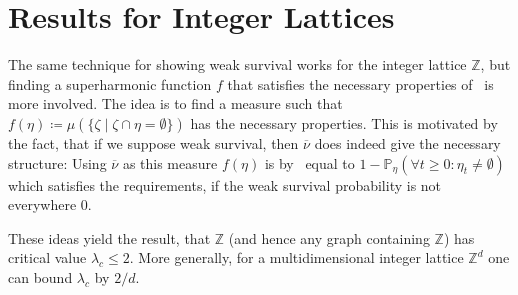 \documentclass[a4paper,11pt]{amsart}
\theoremstyle{theorem}
\theoremstyle{definition}
\newcommand{\Z}{\mathbb{Z}}
\renewcommand{\P}{\mathbb{P}}
\begin{document}
\section{Results for Integer Lattices}

The same technique for showing weak survival works for the integer lattice $\Z$, but finding a superharmonic function $f$ that satisfies the necessary properties of~ is more involved.
The idea is to find a measure such that $f(\eta)\coloneqq \mu(\{  \zeta \mid \zeta\cap\eta = \emptyset \})$ has the necessary properties.
This is motivated by the fact, that if we suppose weak survival, then $\overline{\nu}$ does indeed give the necessary structure:
Using $\overline{\nu}$ as this measure $f(\eta)$ is by~ equal to $1-\P_\eta(\forall t\geq0: \eta_t\neq \emptyset)$ which satisfies the requirements, if the weak survival probability is not everywhere $0$.

These ideas yield the result, that $\Z$ (and hence any graph containing $\Z$) has critical value $\lambda_c\leq 2$.
More generally, for a multidimensional integer lattice $\Z^d$ one can bound $\lambda_c$ by $2/d$.
\end{document}
